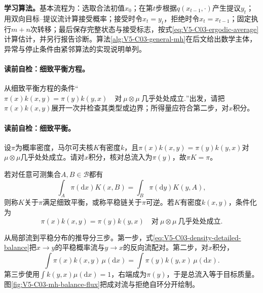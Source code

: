 \label{struct:V5-C03-CH10}
\textbf{学习算法。}基本流程为：选取合法初值$x_0$；在第$t$步根据$q(x_{t-1},\cdot)$产生提议$y_t$；用双向目标--提议流计算接受概率；接受时令$x_t=y_t$，拒绝时令$x_t=x_{t-1}$；固定执行$m+n$次转移；最后保存完整状态与接受标志，按式\eqref{eq:V5-C03-ergodic-average}计算估计，并另行报告诊断。算法\ref{alg:V5-C03-general-mh}在后文给出数学主体，异常与停止条件由紧邻算法的实现说明单列。

\paragraph{读前自检：细致平衡方程。}从细致平衡方程的条件“$\pi(x)k(x,y)=\pi(y)k(y,x) \quad\text{对}\ \mu\otimes\mu\ \text{几乎处处成立}.$”出发，请把$\pi(x)k(x,y)$展开一次并检查其类型或边界；所得量应符合第二步，对$x$积分。\par

\label{struct:V5-C03-CH11}
\paragraph{读前自检：细致平衡。}设$\pi$为概率密度，马尔可夫核$K$有密度$k$，且$\pi(x)k(x,y)=\pi(y)k(y,x)$对$\mu\otimes\mu$几乎处处成立。请对$x$积分，核对总流入为$\pi(y)$，故$\pi K=\pi$。\par

\begin{definition}[细致平衡]
若对任意可测集合$A,B\in\mathcal B$都有
\begin{equation}\label{eq:V5-C03-general-detailed-balance}
\int_A\pi(\mathrm dx)K(x,B)
=\int_B\pi(\mathrm dy)K(y,A),
\end{equation}
则称$K$关于$\pi$满足细致平衡，或称平稳链关于$\pi$可逆。若$K$有密度$k(x,y)$，条件化为
\begin{equation}\label{eq:V5-C03-density-detailed-balance}
\pi(x)k(x,y)=\pi(y)k(y,x)
\quad\text{对}\ \mu\otimes\mu\ \text{几乎处处成立}.
\end{equation}
\end{definition}

从局部流到平稳分布的推导分三步。第一步，式\eqref{eq:V5-C03-density-detailed-balance}把$x\to y$的平稳概率流与$y\to x$的反向流配对。第二步，对$x$积分，
\[
\int\pi(x)k(x,y)\,\mu(\mathrm dx)
=\int\pi(y)k(y,x)\,\mu(\mathrm dx).
\]
第三步使用$\int k(y,x)\mu(\mathrm dx)=1$，右端成为$\pi(y)$，于是总流入等于目标质量。图\ref{fig:V5-C03-mh-balance-flux}把成对流与拒绝自环分开绘制。


